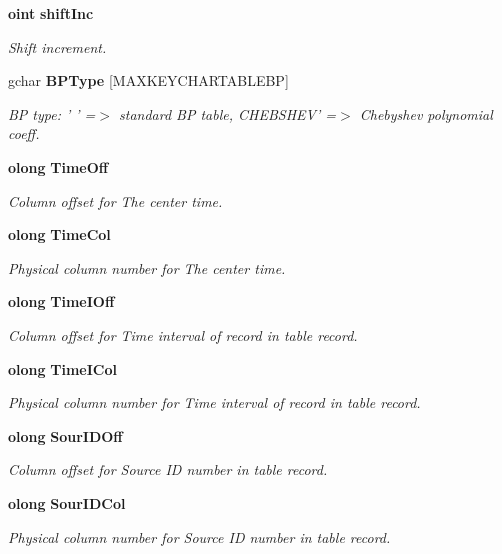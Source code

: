 \begin{CompactItemize}
{\bf oint} {\bf shift\-Inc}
\begin{CompactList}\small\item\em Shift increment. \item\end{CompactList}\item 
gchar {\bf BPType} [MAXKEYCHARTABLEBP]
\begin{CompactList}\small\item\em BP type: ' ' =$>$ standard BP table, CHEBSHEV' =$>$ Chebyshev polynomial coeff. \item\end{CompactList}\item 
{\bf olong} {\bf Time\-Off}
\begin{CompactList}\small\item\em Column offset for The center time. \item\end{CompactList}\item 
{\bf olong} {\bf Time\-Col}
\begin{CompactList}\small\item\em Physical column number for The center time. \item\end{CompactList}\item 
{\bf olong} {\bf Time\-IOff}
\begin{CompactList}\small\item\em Column offset for Time interval of record in table record. \item\end{CompactList}\item 
{\bf olong} {\bf Time\-ICol}
\begin{CompactList}\small\item\em Physical column number for Time interval of record in table record. \item\end{CompactList}\item 
{\bf olong} {\bf Sour\-IDOff}
\begin{CompactList}\small\item\em Column offset for Source ID number in table record. \item\end{CompactList}\item 
{\bf olong} {\bf Sour\-IDCol}
\begin{CompactList}\small\item\em Physical column number for Source ID number in table record. \item\end{CompactList}\item 

\end{CompactItemize}
